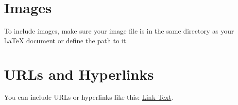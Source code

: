 \documentclass[twocolumn,60pt]{article}
\begin{document}
\section{Images}
To include images, make sure your image file is in the same directory as your LaTeX document or define the path to it.

\section{URLs and Hyperlinks}
You can include URLs or hyperlinks like this: \href{http://www.example.com}{Link Text}.
\end{document}
